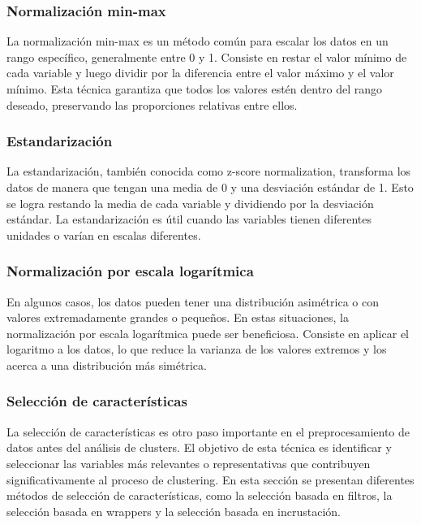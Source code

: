 \documentclass{article}
\begin{document}
\subsubsection{Normalización min-max}
La normalización min-max es un método común para escalar los datos en un rango específico, generalmente entre 0 y 1. Consiste en restar el valor mínimo de cada variable y luego dividir por la diferencia entre el valor máximo y el valor mínimo. Esta técnica garantiza que todos los valores estén dentro del rango deseado, preservando las proporciones relativas entre ellos.

\subsubsection{Estandarización}
La estandarización, también conocida como z-score normalization, transforma los datos de manera que tengan una media de 0 y una desviación estándar de 1. Esto se logra restando la media de cada variable y dividiendo por la desviación estándar. La estandarización es útil cuando las variables tienen diferentes unidades o varían en escalas diferentes.

\subsubsection{Normalización por escala logarítmica}
En algunos casos, los datos pueden tener una distribución asimétrica o con valores extremadamente grandes o pequeños. En estas situaciones, la normalización por escala logarítmica puede ser beneficiosa. Consiste en aplicar el logaritmo a los datos, lo que reduce la varianza de los valores extremos y los acerca a una distribución más simétrica.

\subsubsection{Selección de características}
La selección de características es otro paso importante en el preprocesamiento de datos antes del análisis de clusters. El objetivo de esta técnica es identificar y seleccionar las variables más relevantes o representativas que contribuyen significativamente al proceso de clustering. En esta sección se presentan diferentes métodos de selección de características, como la selección basada en filtros, la selección basada en wrappers y la selección basada en incrustación.
\end{document}
